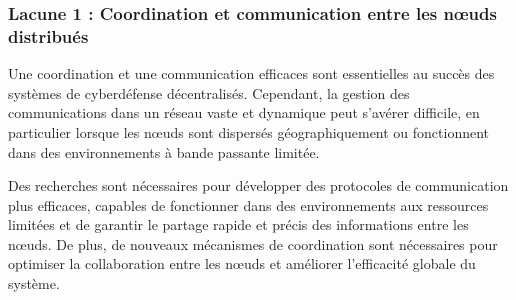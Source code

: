 



\subsubsection{Lacune 1 : Coordination et communication entre les nœuds distribués}

Une coordination et une communication efficaces sont essentielles au succès des systèmes de cyberdéfense décentralisés. Cependant, la gestion des communications dans un réseau vaste et dynamique peut s'avérer difficile, en particulier lorsque les nœuds sont dispersés géographiquement ou fonctionnent dans des environnements à bande passante limitée.

Des recherches sont nécessaires pour développer des protocoles de communication plus efficaces, capables de fonctionner dans des environnements aux ressources limitées et de garantir le partage rapide et précis des informations entre les nœuds. De plus, de nouveaux mécanismes de coordination sont nécessaires pour optimiser la collaboration entre les nœuds et améliorer l'efficacité globale du système.

